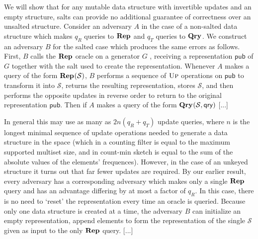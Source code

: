 \documentclass[11pt, pdftex]{article}
\newcommand{\REPO}{\oraclefont{Rep}}
\newcommand{\QRYO}{\oraclefont{Qry}}
\begin{document}
We will show that for any mutable data structure with invertible updates and an empty structure, salts can provide no additional guarantee of correctness over an unsalted structure.  Consider an adversary $A$ in the case of a non-salted data structure which makes $q_R$ queries to $\REPO$ and $q_T$ queries to $\QRYO$. We construct an adversary $B$ for the salted case which produces the same errors as follows. First, $B$ calls the $\REPO$ oracle on a generator $G$ , receiving a representation $\mathsf{pub}$ of $G$ together with the salt used to create the representation. Whenever $A$ makes a query of the form $\REPO(\mathcal{S})$, $B$ performs a sequence of $\textsc{Up}$ operations on $\mathsf{pub}$ to transform it into $\mathcal{S}$, returns the resulting representation, stores $\mathcal{S}$, and then performs the opposite updates in reverse order to return to the original representation $\mathsf{pub}$.   Then if $A$ makes a query of the form $\QRYO(\mathcal{S},\mathsf{qry})$ [...]

In general this may use as many as $2n(q_R+q_T)$ update queries, where $n$ is the longest minimal sequence of update operations needed to generate a data structure in the space (which in a counting filter is equal to the maximum supported multiset size, and in count-min sketch is equal to the sum of the absolute values of the elements' frequences). However, in the case of an unkeyed structure it turns out that far fewer updates are required. By our earlier result, every adversary has a corresponding adversary which makes only a single $\REPO$ query and has an advantage differing by at most a factor of $q_R$. In this case, there is no need to `reset' the representation every time an oracle is queried. Because only one data structure is created at a time, the adversary $B$ can initialize an empty representation, append elements to form the representation of the single $\mathcal{S}$ given as input to the only $\REPO$ query. [...]
\end{document}
